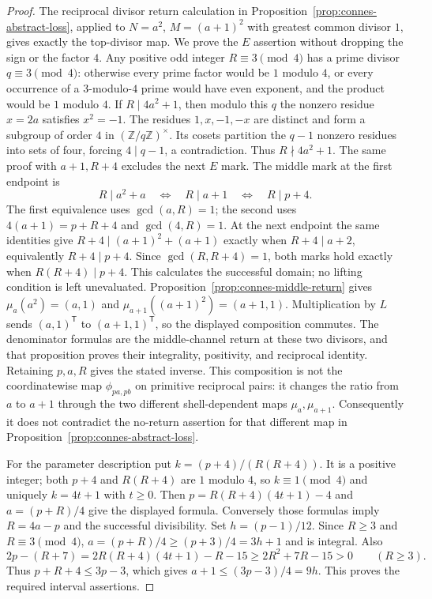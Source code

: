 \begin{proof}
The reciprocal divisor return calculation in
Proposition~\ref{prop:connes-abstract-loss}, applied to
$N=a^2$, $M=(a+1)^2$ with greatest common divisor $1$, gives exactly
the top-divisor map.
We prove the $E$ assertion without dropping the sign or the factor $4$.
Any positive odd integer $R\equiv3\pmod4$ has a prime divisor
$q\equiv3\pmod4$: otherwise every prime factor would be $1$ modulo
$4$, or every occurrence of a $3$-modulo-$4$ prime would have even
exponent, and the product would be $1$ modulo $4$.
If $R\mid4a^2+1$, then modulo this $q$ the nonzero residue $x=2a$
satisfies $x^2=-1$.  The residues $1,x,-1,-x$ are distinct and form a
subgroup of order $4$ in $(\mathbb Z/q\mathbb Z)^\times$.
Its cosets partition the $q-1$ nonzero residues into sets of four,
forcing $4\mid q-1$, a contradiction.  Thus $R\nmid4a^2+1$.
The same proof with $a+1,R+4$ excludes the next $E$ mark.
The middle mark at the first endpoint is
\[
 R\mid a^2+a\quad\Longleftrightarrow\quad R\mid a+1
 \quad\Longleftrightarrow\quad R\mid p+4.
\]
The first equivalence uses $\gcd(a,R)=1$; the second uses
$4(a+1)=p+R+4$ and $\gcd(4,R)=1$.
At the next endpoint the same identities give
$R+4\mid(a+1)^2+(a+1)$ exactly when $R+4\mid a+2$,
equivalently $R+4\mid p+4$.
Since $\gcd(R,R+4)=1$, both marks hold exactly when
$R(R+4)\mid p+4$.  This calculates the successful domain; no lifting
condition is left unevaluated.
Proposition~\ref{prop:connes-middle-return} gives
$\mu_a(a^2)=(a,1)$ and $\mu_{a+1}((a+1)^2)=(a+1,1)$.
Multiplication by $L$ sends $(a,1)^{\mathsf T}$ to
$(a+1,1)^{\mathsf T}$, so the displayed composition commutes.
The denominator formulas are the middle-channel return at these two
divisors, and that proposition proves their integrality, positivity,
and reciprocal identity.  Retaining $p,a,R$ gives the stated inverse.
This composition is not the coordinatewise map $\phi_{pa,pb}$ on
primitive reciprocal pairs: it changes the ratio from $a$ to $a+1$
through the two different shell-dependent maps $\mu_a,\mu_{a+1}$.
Consequently it does not contradict the no-return assertion for that
different map in Proposition~\ref{prop:connes-abstract-loss}.

For the parameter description put $k=(p+4)/(R(R+4))$.
It is a positive integer; both $p+4$ and $R(R+4)$ are $1$ modulo
$4$, so $k\equiv1\pmod4$ and uniquely $k=4t+1$ with $t\ge0$.
Then $p=R(R+4)(4t+1)-4$ and $a=(p+R)/4$ give the displayed formula.
Conversely those formulas imply $R=4a-p$ and the successful divisibility.
Set $h=(p-1)/12$.  Since $R\ge3$ and $R\equiv3\pmod4$,
$a=(p+R)/4\ge(p+3)/4=3h+1$ and is integral.
Also
\[
 2p-(R+7)=2R(R+4)(4t+1)-R-15
 \ge2R^2+7R-15>0\qquad(R\ge3).
\]
Thus $p+R+4\le3p-3$, which gives
$a+1\le(3p-3)/4=9h$.  This proves the required interval assertions.
\end{proof}

